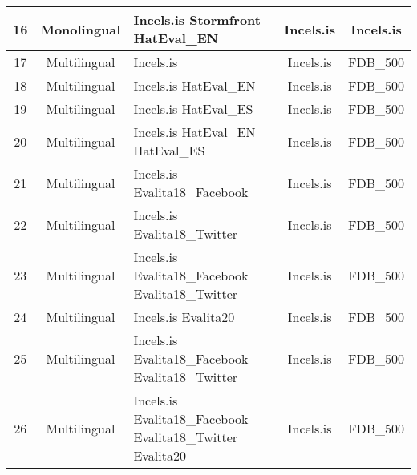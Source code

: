 \begin{tabular}{|c|c|p{3cm}|c|c|}
16 & Monolingual & Incels.is \newline Stormfront \newline HatEval\_EN & Incels.is & Incels.is \\ \hline
17 & Multilingual & Incels.is & Incels.is & FDB\_500 \\ \hline
18 & Multilingual & Incels.is \newline HatEval\_EN & Incels.is & FDB\_500 \\ \hline
19 & Multilingual & Incels.is \newline HatEval\_ES & Incels.is & FDB\_500 \\ \hline
20 & Multilingual & Incels.is \newline HatEval\_EN \newline HatEval\_ES & Incels.is & FDB\_500 \\ \hline
21 & Multilingual & Incels.is \newline Evalita18\_Facebook & Incels.is & FDB\_500 \\ \hline
22 & Multilingual & Incels.is \newline Evalita18\_Twitter & Incels.is & FDB\_500 \\ \hline
23 & Multilingual & Incels.is \newline Evalita18\_Facebook \newline Evalita18\_Twitter & Incels.is & FDB\_500 \\ \hline
24 & Multilingual & Incels.is \newline Evalita20 & Incels.is & FDB\_500 \\ \hline
25 & Multilingual & Incels.is \newline Evalita18\_Facebook \newline Evalita18\_Twitter & Incels.is & FDB\_500 \\ \hline
26 & Multilingual & Incels.is \newline Evalita18\_Facebook \newline Evalita18\_Twitter \newline Evalita20 & Incels.is & FDB\_500 \\ \hline
\end{tabular}